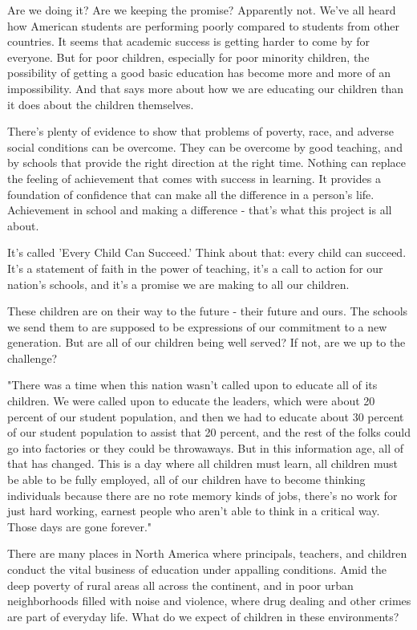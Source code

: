 Are we doing it? Are we keeping the promise? Apparently not.
We've all heard how American students are performing poorly compared to students from other countries.
It seems that academic success is getting harder to come by for everyone.
But for poor children, especially for poor minority children, the possibility of getting a good basic education has become more and more of an impossibility.
And that says more about how we are educating our children than it does about the children themselves.

There's plenty of evidence to show that problems of poverty, race, and adverse social conditions can be overcome.
They can be overcome by good teaching, and by schools that provide the right direction at the right time.
Nothing can replace the feeling of achievement that comes with success in learning.
It provides a foundation of confidence that can make all the difference in a person's life.
Achievement in school and making a difference - that's what this project is all about.

It's called 'Every Child Can Succeed.'
Think about that: every child can succeed.
It's a statement of faith in the power of teaching, it's a call to action for our nation's schools, and it's a promise we are making to all our children.

These children are on their way to the future - their future and ours.
The schools we send them to are supposed to be expressions of our commitment to a new generation.
But are all of our children being well served?
If not, are we up to the challenge?

"There was a time when this nation wasn't called upon to educate all of its children.
We were called upon to educate the leaders, which were about 20 percent of our student population, and then we had to educate about 30 percent of our student population to assist that 20 percent, and the rest of the folks could go into factories or they could be throwaways.
But in this information age, all of that has changed.
This is a day where all children must learn, all children must be able to be fully employed, all of our children have to become thinking individuals because there are no rote memory kinds of jobs, there's no work for just hard working, earnest people who aren't able to think in a critical way.
Those days are gone forever."

There are many places in North America where principals, teachers, and children conduct the vital business of education under appalling conditions.
Amid the deep poverty of rural areas all across the continent, and in poor urban neighborhoods filled with noise and violence, where drug dealing and other crimes are part of everyday life.
What do we expect of children in these environments?

